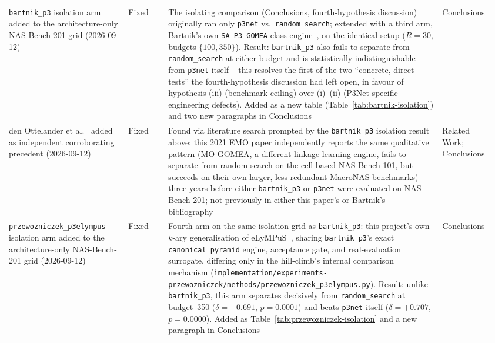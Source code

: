 \begin{longtable}{p{0.24\linewidth} p{0.08\linewidth} p{0.55\linewidth} p{0.09\linewidth}}
\texttt{bartnik\_p3} isolation arm added to the architecture-only NAS-Bench-201 grid (2026-09-12) & Fixed & The isolating comparison (Conclusions, fourth-hypothesis discussion) originally ran only \texttt{p3net} vs.\ \texttt{random\_search}; extended with a third arm, Bartnik's own \texttt{SA-P3-GOMEA}-class engine~\citep{bartnik2026evolutionary,dushatskiy2021novelsurrogateassistedevolutionaryalgorithm}, on the identical setup ($R=30$, budgets $\{100,350\}$). Result: \texttt{bartnik\_p3} also fails to separate from \texttt{random\_search} at either budget and is statistically indistinguishable from \texttt{p3net} itself -- this resolves the first of the two ``concrete, direct tests'' the fourth-hypothesis discussion had left open, in favour of hypothesis (iii) (benchmark ceiling) over (i)--(ii) (P3Net-specific engineering defects). Added as a new table (Table~\ref{tab:bartnik-isolation}) and two new paragraphs in Conclusions & Conclusions \\
den Ottelander et al.~\citep{denottelander2021localsearch} added as independent corroborating precedent (2026-09-12) & Fixed & Found via literature search prompted by the \texttt{bartnik\_p3} isolation result above: this 2021 EMO paper independently reports the same qualitative pattern (MO-GOMEA, a different linkage-learning engine, fails to separate from random search on the cell-based NAS-Bench-101, but succeeds on their own larger, less redundant MacroNAS benchmarks) three years before either \texttt{bartnik\_p3} or \texttt{p3net} were evaluated on NAS-Bench-201; not previously in either this paper's or Bartnik's~\citep{bartnik2026evolutionary} bibliography & Related Work; Conclusions \\
\texttt{przewozniczek\_p3elympus} isolation arm added to the architecture-only NAS-Bench-201 grid (2026-09-12) & Fixed & Fourth arm on the same isolation grid as \texttt{bartnik\_p3}: this project's own $k$-ary generalisation of eLyMPuS~\citep{przewozniczek2026lympus}, sharing \texttt{bartnik\_p3}'s exact \texttt{canonical\_pyramid} engine, acceptance gate, and real-evaluation surrogate, differing only in the hill-climb's internal comparison mechanism (\texttt{implementation/experiments-przewozniczek/methods/przewozniczek\_p3elympus.py}). Result: unlike \texttt{bartnik\_p3}, this arm separates decisively from \texttt{random\_search} at budget~350 ($\delta=+0.691$, $p=0.0001$) and beats \texttt{p3net} itself ($\delta=+0.707$, $p=0.0000$). Added as Table~\ref{tab:przewozniczek-isolation} and a new paragraph in Conclusions & Conclusions \\

\end{longtable}

